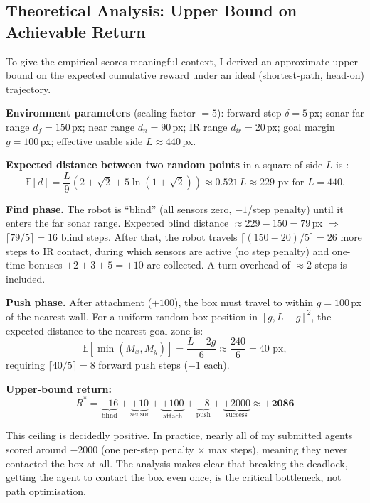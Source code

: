 \documentclass[11pt, oneside]{article}
\begin{document}
\subsection{Theoretical Analysis: Upper Bound on Achievable Return}

To give the empirical scores meaningful context, I derived an approximate upper bound on the expected cumulative reward under an ideal (shortest-path, head-on) trajectory.

\textbf{Environment parameters} (scaling factor $= 5$): forward step $\delta = 5$\,px; sonar far range $d_f = 150$\,px; near range $d_n = 90$\,px; IR range $d_{ir} = 20$\,px; goal margin $g = 100$\,px; effective usable side $L \approx 440$\,px.

\textbf{Expected distance between two random points} in a square of side $L$ is \cite{robbins1978}:
\[
  \mathbb{E}[d] = \frac{L}{9}\!\left(2 + \sqrt{2} + 5\ln(1+\sqrt{2})\right) \approx 0.521\,L \approx 229\text{ px for } L=440.
\]

\textbf{Find phase.} The robot is ``blind'' (all sensors zero, $-1$/step penalty) until it enters the far sonar range. Expected blind distance $\approx 229 - 150 = 79$\,px $\Rightarrow$ $\lceil 79/5 \rceil = 16$ blind steps. After that, the robot travels $\lceil(150-20)/5\rceil = 26$ more steps to IR contact, during which sensors are active (no step penalty) and one-time bonuses $+2+3+5=+10$ are collected. A turn overhead of $\approx 2$ steps is included.

\textbf{Push phase.} After attachment ($+100$), the box must travel to within $g=100$\,px of the nearest wall. For a uniform random box position in $[g, L{-}g]^2$, the expected distance to the nearest goal zone is:
\[
  \mathbb{E}\!\left[\min(M_x, M_y)\right] = \frac{L - 2g}{6} \approx \frac{240}{6} = 40\text{ px},
\]
requiring $\lceil 40/5 \rceil = 8$ forward push steps ($-1$ each).

\textbf{Upper-bound return:}
\[
  R^* = \underbrace{-16}_{\text{blind}} + \underbrace{+10}_{\text{sensor}} + \underbrace{+100}_{\text{attach}} + \underbrace{-8}_{\text{push}} + \underbrace{+2000}_{\text{success}} \approx \mathbf{+2086}
\]

This ceiling is decidedly positive. In practice, nearly all of my submitted agents scored around $-2000$ (one per-step penalty $\times$ max steps), meaning they never contacted the box at all. The analysis makes clear that breaking the deadlock, getting the agent to contact the box even once, is the critical bottleneck, not path optimisation.
\end{document}
